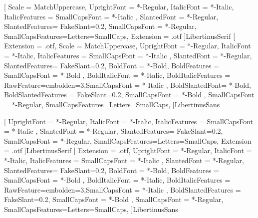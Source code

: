 \ifLuaTeX
\usepackage[bidi=basic]{babel}
\else
\usepackage[bidi=default]{babel}
\fi


[
	Scale = MatchUppercase,		%
	UprightFont = *-Regular,
	ItalicFont = *-Italic,
	ItalicFeatures = { SmallCapsFont = *-Italic },
	SlantedFont = *-Regular,
	SlantedFeatures= {FakeSlant=0.2},
	SmallCapsFont = *-Regular,
	SmallCapsFeatures={Letters=SmallCaps},
	Extension = .otf
]{LibertinusSerif}
[
	Extension = .otf,
	Scale = MatchUppercase,		%
	UprightFont = *-Regular,
	ItalicFont = *-Italic,
	ItalicFeatures = { SmallCapsFont = *-Italic },
	SlantedFont = *-Regular,
	SlantedFeatures= {FakeSlant=0.2},
	BoldFont = *-Bold,
	BoldFeatures = { SmallCapsFont = *-Bold },
	BoldItalicFont = *-Italic,
	BoldItalicFeatures = {RawFeature={embolden=3},SmallCapsFont = *-Italic },
	BoldSlantedFont= *-Bold,
	BoldSlantedFeatures = {FakeSlant=0.2, SmallCapsFont = *-Bold },
	SmallCapsFont = *-Regular,
	SmallCapsFeatures={Letters=SmallCaps},
]{LibertinusSans}

[
	UprightFont = *-Regular,
	ItalicFont = *-Italic,
	ItalicFeatures = { SmallCapsFont = *-Italic },
	SlantedFont = *-Regular,
	SlantedFeatures= {FakeSlant=0.2},
	SmallCapsFont = *-Regular,
	SmallCapsFeatures={Letters=SmallCaps},
	Extension = .otf
]{LibertinusSerif}
[
	Extension = .otf,
	UprightFont = *-Regular,
	ItalicFont = *-Italic,
	ItalicFeatures = { SmallCapsFont = *-Italic },
	SlantedFont = *-Regular,
	SlantedFeatures= {FakeSlant=0.2},
	BoldFont = *-Bold,
	BoldFeatures = { SmallCapsFont = *-Bold },
	BoldItalicFont = *-Italic,
	BoldItalicFeatures = {RawFeature={embolden=3},SmallCapsFont = *-Italic },
	BoldSlantedFeatures = {FakeSlant=0.2, SmallCapsFont = *-Bold },
	SmallCapsFont = *-Regular,
	SmallCapsFeatures={Letters=SmallCaps},
]{LibertinusSans}
